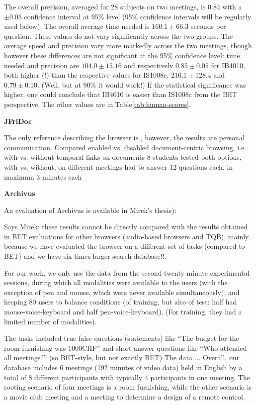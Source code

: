 \documentclass[11pt]{article}
\begin{document}
The overall precision, averaged for 28 subjects on two meetings, is 0.84 with a $\pm0.05$ confidence interval at 95\% level (95\% confidence intervals will be regularly used below).  
The overall average time needed is  $160.1\pm66.3$ seconds per question.  These values do not vary significantly across the two groups.  
The average speed and precision vary more markedly across the two meetings, though however these differences are not significant at the 95\% confidence level: 
time needed and precision are $104.0\pm15.16$ and respectively $0.85\pm0.05$ for IB4010, 
both higher (!) than the respective values for IS1008c, $216.1\pm128.4$ and $0.79\pm0.10$.  
(Well, but at 90\% it would work!) If the statistical significance was higher, one could conclude that IB4010 is easier than IS1008c from the BET perspective.  The other values are in Table\ref{tab:human-scores}.

\textbf{JFriDoc}

The only reference describing the browser is \cite{rigamonti06}, however, the results are personal communication.
Compared enabled vs. disabled document-centric browsing, i.e. with vs. without temporal links on documents
8 students tested both options, with vs. without, on different meetings
had to answer 12 questions each, in maximum 3 minutes each

\textbf{Archivus}

An evaluation of Archivus is available in Mirek's thesis): \cite{Melichar2008} %

Says Mirek: these results cannot be directly
compared with the results obtained in BET evaluations for other browsers (audio-based
browsers and TQB), mainly because we have evaluated the browser on a different
set of tasks (compared to BET) and we have six-times larger search database!!.

For our work, we only use the data from the second twenty minute
experimental sessions, during which all modalities were available to the users
(with the exception of pen and mouse, which were never available simultaneously), and keeping 80 users to balance conditions (of training, but also of test: half had mouse-voice-keyboard and half pen-voice-keyboard).  (For training, they had a limited number of modalities).

The tasks included true-false questions
(statements) like ``The budget for the room furnishing was 1000CHF'' and short-answer
questions like ``Who attended all meetings?'' (so BET-style, but not exactly BET)
The data ... Overall, our database includes 6 meetings (192 minutes of video data) held in English
by a total of 8 different participants with typically 4 participants in one meeting. The
rooting scenario of four meetings is a room furnishing, while the other scenario is a movie
club meeting and a meeting to determine a design of a remote control.
\end{document}
